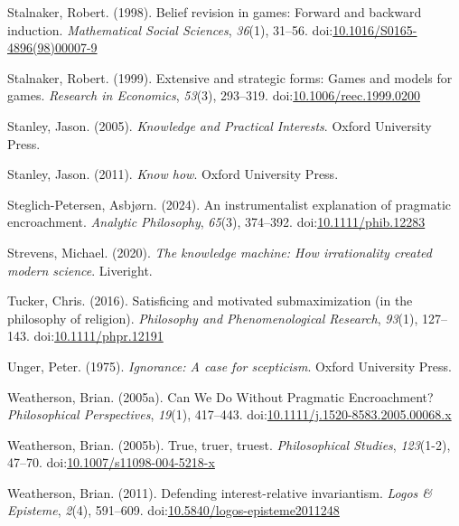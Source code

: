 \documentclass[
  10pt,
  letterpaper,
  twoside]{scrbook}
\newlength{\cslhangindent}
\newenvironment{CSLReferences}[2] %
 {\begin{list}{}{%
  \setlength{\itemindent}{0pt}
  \setlength{\leftmargin}{0pt}
  \setlength{\parsep}{0pt}
  \ifodd #1
   \setlength{\leftmargin}{\cslhangindent}
   \setlength{\itemindent}{-1\cslhangindent}
  \fi
  \setlength{\itemsep}{#2\baselineskip}}}
 {\end{list}}
\begin{document}
\begin{CSLReferences}{1}{0}
Stalnaker, Robert. (1998). Belief revision in games: Forward and
backward induction. \emph{Mathematical Social Sciences}, \emph{36}(1),
31--56.
doi:\href{https://doi.org/10.1016/S0165-4896(98)00007-9}{10.1016/S0165-4896(98)00007-9}

Stalnaker, Robert. (1999). Extensive and strategic forms: Games and
models for games. \emph{Research in Economics}, \emph{53}(3), 293--319.
doi:\href{https://doi.org/10.1006/reec.1999.0200}{10.1006/reec.1999.0200}

Stanley, Jason. (2005). \emph{{Knowledge and Practical Interests}}.
Oxford University Press.

Stanley, Jason. (2011). \emph{Know how}. Oxford University Press.

Steglich-Petersen, Asbjørn. (2024). An instrumentalist explanation of
pragmatic encroachment. \emph{Analytic Philosophy}, \emph{65}(3),
374--392.
doi:\href{https://doi.org/10.1111/phib.12283}{10.1111/phib.12283}

Strevens, Michael. (2020). \emph{The knowledge machine: How
irrationality created modern science}. Liveright.

Tucker, Chris. (2016). Satisficing and motivated submaximization (in the
philosophy of religion). \emph{Philosophy and Phenomenological
Research}, \emph{93}(1), 127--143.
doi:\href{https://doi.org/10.1111/phpr.12191}{10.1111/phpr.12191}

Unger, Peter. (1975). \emph{Ignorance: A case for scepticism}. Oxford
University Press.

Weatherson, Brian. (2005a). {Can We Do Without Pragmatic Encroachment?}
\emph{Philosophical Perspectives}, \emph{19}(1), 417--443.
doi:\href{https://doi.org/10.1111/j.1520-8583.2005.00068.x}{10.1111/j.1520-8583.2005.00068.x}

Weatherson, Brian. (2005b). True, truer, truest. \emph{Philosophical
Studies}, \emph{123}(1-2), 47--70.
doi:\href{https://doi.org/10.1007/s11098-004-5218-x}{10.1007/s11098-004-5218-x}

Weatherson, Brian. (2011). Defending interest-relative invariantism.
\emph{Logos \& Episteme}, \emph{2}(4), 591--609.
doi:\href{https://doi.org/10.5840/logos-episteme2011248}{10.5840/logos-episteme2011248}


\end{CSLReferences}
\end{document}
